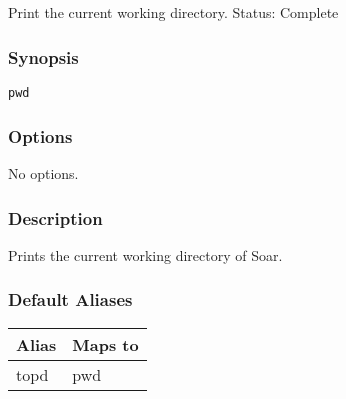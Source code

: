 \subsection{}
\label{pwd}
Print the current working directory. 
 Status: Complete
\subsubsection*{Synopsis}
\begin{verbatim}
pwd
\end{verbatim}
\subsubsection*{Options}
 No options. 
\subsubsection*{Description}
 Prints the current working directory of Soar. 
\subsubsection*{Default Aliases}
\begin{tabular}{|l|l|}
\hline 
 Alias  & Maps to  \\
 \hline 
 topd  & pwd  \\
 \hline 
\end{tabular}
